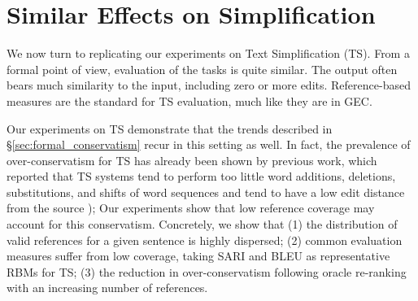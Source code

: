 \documentclass[letterpaper, 11pt]{article}
\newcommand{\oa}[1]{}
\begin{document}



\section{Similar Effects on Simplification}\label{sec:simplification}

We now turn to replicating our experiments on Text Simplification (TS). From a formal point of view, evaluation of the tasks is quite similar. The output often bears much similarity to the input, including zero or more edits. Reference-based measures are the standard for TS evaluation,
much like they are in GEC.


Our experiments on TS demonstrate that the trends described in \S\ref{sec:formal_conservatism} recur in this setting as well. 
In fact, the prevalence of over-conservatism for TS has already been shown by previous work, 
which reported that TS systems tend to perform too little word additions, deletions,
substitutions, and shifts of word sequences \cite{zhang2017sentence} 
and tend to have a low edit distance from the source \cite{narayan2015unsupervised});
Our experiments show that low reference coverage may account for this conservatism. Concretely, we show that
(1) the distribution of valid references for a given sentence is highly dispersed; (2) common evaluation measures suffer from
low coverage, taking SARI and BLEU as representative RBMs for TS;  
(3) the reduction in over-conservatism following oracle re-ranking with an increasing number of references.
\end{document}
